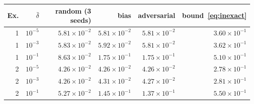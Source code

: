 \begin{tabular}{rrrrrr}
\toprule
Ex. & $\bar\delta$ & random (3 seeds) & bias & adversarial & bound~\eqref{eq:inexact}\\
\midrule
1 & $10^{-5}$ & $5.81\times10^{-2}$ & $5.81\times10^{-2}$ & $5.81\times10^{-2}$ & $3.60\times10^{-1}$\\
1 & $10^{-3}$ & $5.83\times10^{-2}$ & $5.92\times10^{-2}$ & $5.81\times10^{-2}$ & $3.62\times10^{-1}$\\
1 & $10^{-1}$ & $8.63\times10^{-2}$ & $1.75\times10^{-1}$ & $1.75\times10^{-1}$ & $5.10\times10^{-1}$\\
2 & $10^{-5}$ & $4.26\times10^{-2}$ & $4.26\times10^{-2}$ & $4.26\times10^{-2}$ & $2.78\times10^{-1}$\\
2 & $10^{-3}$ & $4.26\times10^{-2}$ & $4.31\times10^{-2}$ & $4.27\times10^{-2}$ & $2.81\times10^{-1}$\\
2 & $10^{-1}$ & $5.27\times10^{-2}$ & $1.45\times10^{-1}$ & $1.37\times10^{-1}$ & $5.50\times10^{-1}$\\
\bottomrule
\end{tabular}